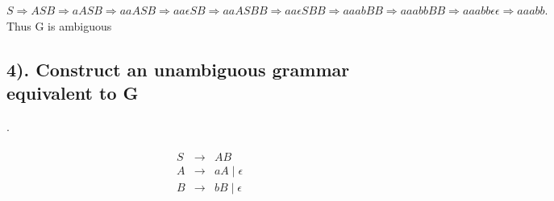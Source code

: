\documentclass[20pt]{article} %
\begin{document}
$S \Rightarrow ASB \Rightarrow aASB \Rightarrow aaASB \Rightarrow aa\epsilon SB \Rightarrow aaASBB \Rightarrow aa\epsilon SBB \Rightarrow aaabBB \Rightarrow aaabbBB \Rightarrow aaabb\epsilon \epsilon \Rightarrow aaabb.$ \\

Thus G is ambiguous

\subsection{4). Construct an unambiguous grammar equivalent to G}.
 \begin{table}[!htbp]
 \[\begin{array}{ccc} 
&  \\
 S & \rightarrow & AB \\
 A & \rightarrow & aA \mid \epsilon \\
 B & \rightarrow  & bB \mid \epsilon \\
 \end{array}\]
 \end{table}
\end{document}
